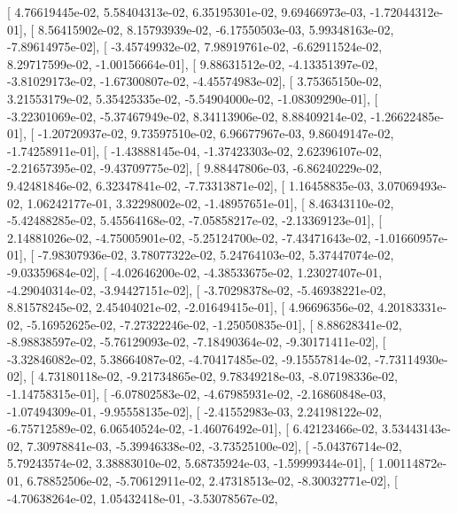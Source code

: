 \documentclass{article}
\begin{document}
       [  4.76619445e-02,   5.58404313e-02,   6.35195301e-02,
          9.69466973e-03,  -1.72044312e-01],
       [  8.56415902e-02,   8.15793939e-02,  -6.17550503e-03,
          5.99348163e-02,  -7.89614975e-02],
       [ -3.45749932e-02,   7.98919761e-02,  -6.62911524e-02,
          8.29717599e-02,  -1.00156664e-01],
       [  9.88631512e-02,  -4.13351397e-02,  -3.81029173e-02,
         -1.67300807e-02,  -4.45574983e-02],
       [  3.75365150e-02,   3.21553179e-02,   5.35425335e-02,
         -5.54904000e-02,  -1.08309290e-01],
       [ -3.22301069e-02,  -5.37467949e-02,   8.34113906e-02,
          8.88409214e-02,  -1.26622485e-01],
       [ -1.20720937e-02,   9.73597510e-02,   6.96677967e-03,
          9.86049147e-02,  -1.74258911e-01],
       [ -1.43888145e-04,  -1.37423303e-02,   2.62396107e-02,
         -2.21657395e-02,  -9.43709775e-02],
       [  9.88447806e-03,  -6.86240229e-02,   9.42481846e-02,
          6.32347841e-02,  -7.73313871e-02],
       [  1.16458835e-03,   3.07069493e-02,   1.06242177e-01,
          3.32298002e-02,  -1.48957651e-01],
       [  8.46343110e-02,  -5.42488285e-02,   5.45564168e-02,
         -7.05858217e-02,  -2.13369123e-01],
       [  2.14881026e-02,  -4.75005901e-02,  -5.25124700e-02,
         -7.43471643e-02,  -1.01660957e-01],
       [ -7.98307936e-02,   3.78077322e-02,   5.24764103e-02,
          5.37447074e-02,  -9.03359684e-02],
       [ -4.02646200e-02,  -4.38533675e-02,   1.23027407e-01,
         -4.29040314e-02,  -3.94427151e-02],
       [ -3.70298378e-02,  -5.46938221e-02,   8.81578245e-02,
          2.45404021e-02,  -2.01649415e-01],
       [  4.96696356e-02,   4.20183331e-02,  -5.16952625e-02,
         -7.27322246e-02,  -1.25050835e-01],
       [  8.88628341e-02,  -8.98838597e-02,  -5.76129093e-02,
         -7.18490364e-02,  -9.30171411e-02],
       [ -3.32846082e-02,   5.38664087e-02,  -4.70417485e-02,
         -9.15557814e-02,  -7.73114930e-02],
       [  4.73180118e-02,  -9.21734865e-02,   9.78349218e-03,
         -8.07198336e-02,  -1.14758315e-01],
       [ -6.07802583e-02,  -4.67985931e-02,  -2.16860848e-03,
         -1.07494309e-01,  -9.95558135e-02],
       [ -2.41552983e-03,   2.24198122e-02,  -6.75712589e-02,
          6.06540524e-02,  -1.46076492e-01],
       [  6.42123466e-02,   3.53443143e-02,   7.30978841e-03,
         -5.39946338e-02,  -3.73525100e-02],
       [ -5.04376714e-02,   5.79243574e-02,   3.38883010e-02,
          5.68735924e-03,  -1.59999344e-01],
       [  1.00114872e-01,   6.78852506e-02,  -5.70612911e-02,
          2.47318513e-02,  -8.30032771e-02],
       [ -4.70638264e-02,   1.05432418e-01,  -3.53078567e-02,
\end{document}
